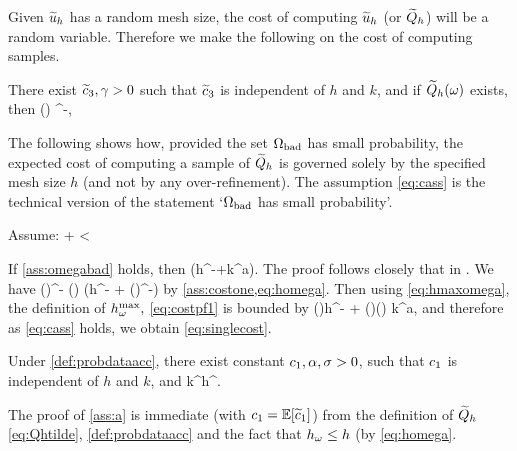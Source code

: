 Given $\widetilde{u}_{h}$ has a random mesh size, the cost of computing $\widetilde{u}_{h}$ (or $\widetilde{Q}_{h}$) will be a random variable. Therefore we make the following  on the cost of computing samples.

\label{ass:costone}
There exist $\widetilde{c}_{3}, \gamma > 0$ such that $\widetilde{c}_{3}$ is independent of $h$ and $k$, and if $\widetilde{Q}_{h}(\omega)$ exists, then
\beqs
\Cost{\Qhtilde(\omega)} \leq \cthtilde(\omega) \homega^{-\gamma},
\eeqs
\eas

The following  shows how, provided the set $\Omega_{\mathrm{bad}}$ has small probability, the expected cost of computing a sample of $\widetilde{Q}_{h}$ is governed solely by the specified mesh size $h$ (and not by any over-refinement). The assumption \cref{eq:cass} is the technical version of the statement `$\Omega_{\mathrm{bad}}$ has small probability'.

\label{ass:omegabad}
Assume:
\beq\label{eq:cass}
\cth \de \EXP{\cthtilde}+ \EXP{\cthtilde\Co^{-\gamma}} < \infty
\eeq
\eas

\label{lem:c}
If \cref{ass:omegabad} holds, then 
\beq\label{eq:singlecost}
\EXP{\Cost{\Qh}} \leq \cth \mleft(h^{-\gamma}+k^{a\gamma}\mright).
\eeq
\ele
{}
The proof follows closely that in \cite[Lemma 5.8]{GrPaSc:19}.
We have
\beq\label{eq:costpf1}
\Cost{\uhtilde(\omega)} \leq \cthtilde(\omega)\homega^{-\gamma} \leq \cthtilde(\omega) \mleft(h^{-\gamma} + \mleft(\hmaxomega\mright)^{-\gamma}\mright)
\eeq
by \cref{ass:costone,eq:homega}. Then using \cref{eq:hmaxomega}, the definition of $h^{\max}_{\omega},$ \cref{eq:costpf1} is bounded by
\beq\label{eq:costpf2}
\cthtilde(\omega)h^{-\gamma} + \mleft(\cthtilde\Co\mright)(\omega) k^{a\gamma},
\eeq
and therefore as \cref{eq:cass} holds, we obtain \cref{eq:singlecost}.
\epf

\label{ass:a}
Under \cref{def:probdataacc}, there exist constant $c_{1}, \alpha, \sigma> 0$, such that $c_{1}$ is independent of $h$ and $k$, and
\beqs
{} \leq \co k^\sigma h^{\alpha}.
\eeqs
\ele

The proof of \cref{ass:a} is immediate (with $\co = \EXP{\cotilde}$) from the definition of $\widetilde{Q}_{h}$ \cref{eq:Qhtilde}, \cref{def:probdataacc} and the fact that $h_{\omega} \leq h$ (by \cref{eq:homega}.
\epf


